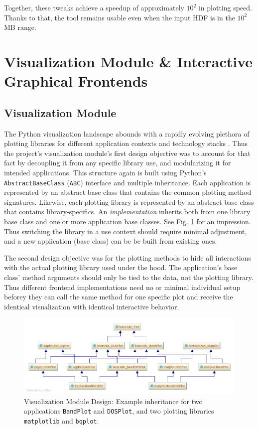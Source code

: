 Together, these tweaks achieve a speedup of approximately \(10^2\) in plotting
speed. Thanks to that, the tool remains usable even when the input HDF is in the
\(10^2\) MB range.

\section{Visualization Module \& Interactive Graphical Frontends}
\label{sec:visualization-module}

\subsection{Visualization Module}
\label{sec:visualization-interface}

The Python visualization landscape abounds with a rapidly evolving plethora of
plotting libraries for different application contexts and technology stacks
\cite{python-viz-landscape}. Thus the project's visualization module's first
design objective was to account for that fact by decoupling it from any specific library
use, and modularizing it for intended applications. This structure again is built using Python's
\texttt{AbstractBaseClass} (\texttt{ABC}) interface and multiple inheritance.
Each application is represented by an abstract base class that contains the
common plotting method signatures. Likewise, each plotting library is represented by an
abstract base class that contains library-specifics. An \emph{implementation} inherits
both from one library base class and one or more application base classes. See
Fig. \ref{fig:visualization-module} for an impression. Thus switching the
library in a use context should require minimal adjustment, and a new
application (base class) can be be built from existing ones.

The second design objective was for the plotting methods to hide all
interactions with the actual plotting library used under the hood. The
application's base class' method arguments should only be tied to the data, not
the plotting library. Thus different frontend implementations need no or minimal
individual setup beforey they can call the same method for one specific plot
and receive the identical visualization with identical interactive behavior.

\begin{figure}[htb!]
    \centering
    \includegraphics[width=1.0\linewidth]{img/pycharm_uml/matplot.png}
    \caption[Visualization Module Design]{Visualization Module Design: Example
      inheritance for two applications \texttt{BandPlot} and \texttt{DOSPlot}, and
      two plotting libraries \texttt{matplotlib} and \texttt{bqplot}.}
    \label{fig:visualization-module}
\end{figure}

